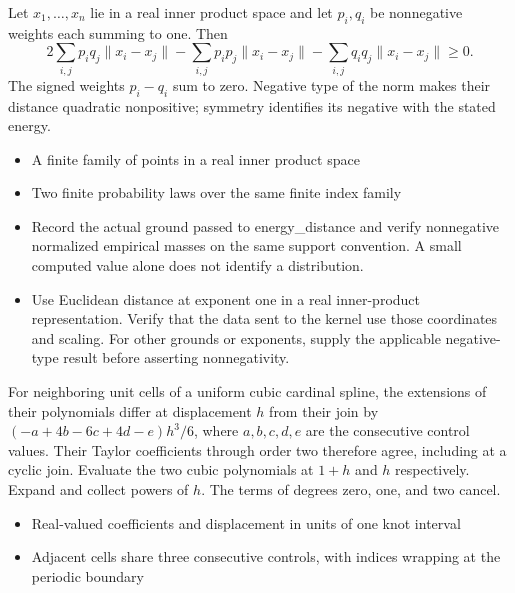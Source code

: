 \expandafter\def\csname statadic@statement@STATADIC-ENERGY-003\endcsname{Let $x_1,\ldots,x_n$ lie in a real inner product space and let
  $p_i,q_i$ be nonnegative weights each summing to one. Then
  \[
    2\sum_{i,j}p_iq_j\lVert x_i-x_j\rVert-
    \sum_{i,j}p_ip_j\lVert x_i-x_j\rVert-
    \sum_{i,j}q_iq_j\lVert x_i-x_j\rVert\geq 0.
  \]}
\expandafter\def\csname statadic@proof@STATADIC-ENERGY-003\endcsname{The signed weights $p_i-q_i$ sum to zero. Negative type of the
  norm makes their distance quadratic nonpositive; symmetry identifies its
  negative with the stated energy.}
\expandafter\def\csname statadic@assumptions@STATADIC-ENERGY-003\endcsname{\begin{itemize}
\item A finite family of points in a real inner product space
\item Two finite probability laws over the same finite index family
\end{itemize}}
\expandafter\def\csname statadic@diagnostics@STATADIC-ENERGY-003\endcsname{\begin{itemize}
\item Record the actual ground passed to energy\_distance and verify nonnegative normalized empirical masses on the same support convention. A small computed value alone does not identify a distribution.
\item Use Euclidean distance at exponent one in a real inner-product representation. Verify that the data sent to the kernel use those coordinates and scaling. For other grounds or exponents, supply the applicable negative-type result before asserting nonnegativity.
\end{itemize}}
\expandafter\def\csname statadic@statement@STATADIC-SPLINE-001\endcsname{For neighboring unit cells of a uniform cubic cardinal
  spline, the extensions of their polynomials differ at displacement $h$
  from their join by $(-a+4b-6c+4d-e)h^3/6$, where $a,b,c,d,e$
  are the consecutive control values. Their Taylor coefficients through
  order two therefore agree, including at a cyclic join.}
\expandafter\def\csname statadic@proof@STATADIC-SPLINE-001\endcsname{Evaluate the two cubic polynomials at $1+h$ and $h$
  respectively. Expand and collect powers of $h$. The terms of degrees
  zero, one, and two cancel.}
\expandafter\def\csname statadic@assumptions@STATADIC-SPLINE-001\endcsname{\begin{itemize}
\item Real-valued coefficients and displacement in units of one knot interval
\item Adjacent cells share three consecutive controls, with indices wrapping at the periodic boundary
\end{itemize}}

